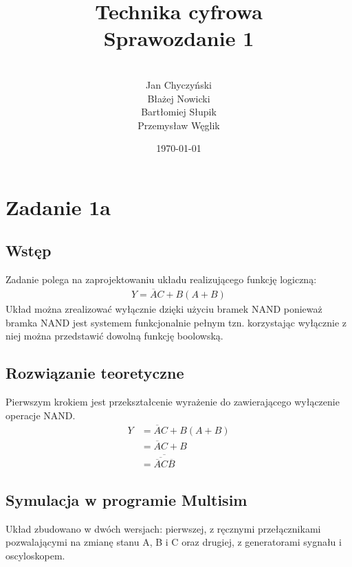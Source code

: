 \documentclass[12pt,a4paper,openright]{mwrep}
\begin{document}
\title{%
Technika cyfrowa\\
Sprawozdanie 1\\
}

\author{\\Jan Chyczyński\\Błażej Nowicki
\\Bartłomiej Słupik\\Przemysław Węglik}

\date{\today}

\maketitle

\chapter{Zadanie 1a}

\section{Wstęp}
Zadanie polega na zaprojektowaniu układu realizującego 
funkcję logiczną:
\begin{align*}
    Y = \overline{A}C + B(A + B)
\end{align*}
Układ można zrealizować wyłącznie dzięki użyciu bramek NAND
ponieważ bramka NAND jest systemem funkcjonalnie pełnym tzn.
korzystając wyłącznie z niej można przedstawić dowolną funkcję
boolowską.

\section{Rozwiązanie teoretyczne}
Pierwszym krokiem jest przekształcenie wyrażenie do zawierającego
wyłączenie operacje NAND.
\begin{align*}
    Y &= \overline{A}C + B(A + B) \\
    &= \overline{A}C + B \\
    &= \overline{\overline{\overline{A}C}\overline{B}}
\end{align*}

\section{Symulacja w programie Multisim}
Układ zbudowano w dwóch wersjach: pierwszej, z ręcznymi przełącznikami 
pozwalającymi na zmianę stanu A, B i C oraz drugiej, z generatorami sygnału
i oscyloskopem.
\end{document}

